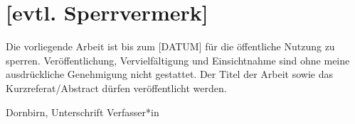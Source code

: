 \documentclass[a4paper,12pt,twoside]{scrreprt}
\begin{document}
\thispagestyle{empty}


\section*{[evtl. Sperrvermerk]}   %
Die vorliegende Arbeit ist bis zum [DATUM] für die öffentliche Nutzung zu
sperren. Veröffentlichung, Vervielfältigung und Einsichtnahme sind ohne meine
ausdrückliche Genehmigung nicht gestattet. Der Titel der Arbeit sowie das
Kurzreferat/Abstract dürfen veröffentlicht werden.

\vspace{3cm}

\noindent Dornbirn, \hfill Unterschrift Verfasser*in
\end{document}
